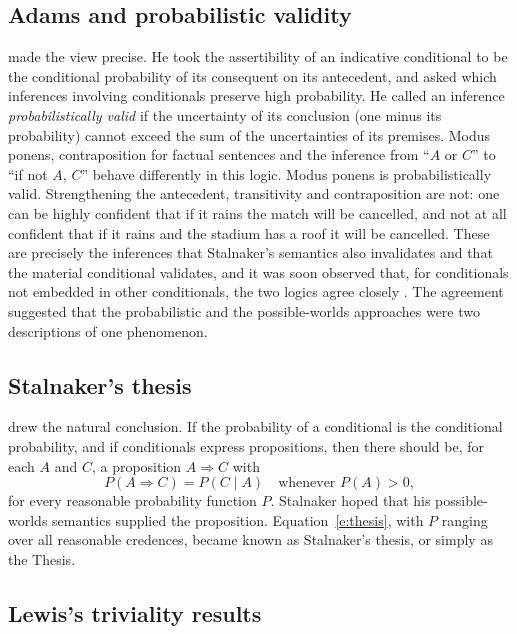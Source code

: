 \documentclass{situationist-preprint}
\begin{document}
\subsection{Adams and probabilistic validity}

\citet{Adams1965,Adams1975} made the view precise. He took the assertibility of an indicative conditional to be the conditional probability of its consequent on its antecedent, and asked which inferences involving conditionals preserve high probability. He called an inference \emph{probabilistically valid} if the uncertainty of its conclusion (one minus its probability) cannot exceed the sum of the uncertainties of its premises. Modus ponens, contraposition for factual sentences and the inference from \enquote{$A$ or $C$} to \enquote{if not $A$, $C$} behave differently in this logic. Modus ponens is probabilistically valid. Strengthening the antecedent, transitivity and contraposition are not: one can be highly confident that if it rains the match will be cancelled, and not at all confident that if it rains and the stadium has a roof it will be cancelled. These are precisely the inferences that Stalnaker's semantics also invalidates and that the material conditional validates, and it was soon observed that, for conditionals not embedded in other conditionals, the two logics agree closely \citep{Gibbard1981}. The agreement suggested that the probabilistic and the possible-worlds approaches were two descriptions of one phenomenon.

\subsection{Stalnaker's thesis}

\citet{Stalnaker1970} drew the natural conclusion. If the probability of a conditional is the conditional probability, and if conditionals express propositions, then there should be, for each $A$ and $C$, a proposition $A \Rightarrow C$ with
\begin{equation}\label{e:thesis}
P(A \Rightarrow C) = P(C \mid A) \quad\text{whenever } P(A) > 0,
\end{equation}
for every reasonable probability function $P$. Stalnaker hoped that his possible-worlds semantics supplied the proposition. Equation~\eqref{e:thesis}, with $P$ ranging over all reasonable credences, became known as Stalnaker's thesis, or simply as the Thesis.

\subsection{Lewis's triviality results}
\end{document}
